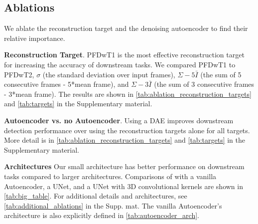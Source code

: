 \subsection{Ablations}
We ablate the reconstruction target and the denoising autoencoder to find their relative importance.

\noindent{}\textbf{Reconstruction Target}. PFDwT1 is the most effective reconstruction target for increasing the accuracy of downstream tasks. We compared PFDwT1 to PFDwT2, $\sigma$ (the standard deviation over input frames), $\Sigma-5\bar{I}$ (the sum of 5 consecutive frames - 5*mean frame), and $\Sigma-3\bar{I}$ (the sum of 3 consecutive frames - 3*mean frame). The results are shown in  \cref{tab:ablation_reconstruction_targets} and \cref{tab:targets} in the Supplementary material.

\noindent{}\textbf{Autoencoder vs. no Autoencoder}. Using a DAE improves downstream detection performance over using the reconstruction targets alone for all targets. More detail is in \cref{tab:ablation_reconstruction_targets} and \cref{tab:targets} in the Supplementary material.


\noindent{}\textbf{Architectures} Our small architecture has better performance on downstream tasks compared to larger architectures. Comparisons of \NAME{} with a vanilla Autoencoder, a UNet\cite{unet}, and a UNet\cite{unet} with 3D convolutional kernels are shown in \cref{tab:big_table}. For additional details and architectures, see \cref{tab:additional_ablations} in the Supp. mat. The vanilla Autoencoder's architecture is also explicitly defined in \cref{tab:autoencoder_arch}.
